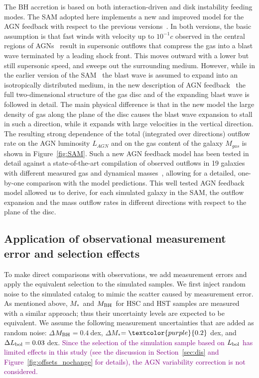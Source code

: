 \documentclass[twocolumn]{aastex631}
\newcommand{\red}[1]{\textcolor{purple}{#1}}
\def\smass{{$M_*$}}
\def\mbh{$M_{\rm BH}$}
\begin{document}
The BH accretion is based on both interaction-driven and disk instability feeding modes.
The SAM adopted here implements a new and improved  model for the AGN feedback with respect to the previous versions~\citep{Menci2008}. In both versions, the basic assumption is that fast winds with velocity up to $10^{-1}c$ observed in the central regions of AGNs~\citep{Chartas2002, Pounds2003}  result in  supersonic outflows that compress the gas into a blast wave terminated by a leading shock front. This  moves outward with a lower but still supersonic speed, and sweeps out the surrounding medium. However, while in the earlier version of the SAM~\citep{Menci2016} the blast wave is assumed to expand into an isotropically distributed medium, in the new description of AGN feedback~\citep{Menci2019} the full two-dimensional structure of the gas disc and of the expanding blast wave is followed in detail. The main physical difference is that in the new model the large density of gas along the plane of the disc causes the blast wave expansion to stall in such a direction, while it expands with large velocities in the vertical direction. The resulting strong dependence of the total (integrated over directions) outflow rate on the AGN luminosity $L_{AGN}$ and on the gas content of the galaxy $M_{gas}$ is shown in Figure~\ref{fig:SAM}. Such a new AGN feedback model has been tested in detail against a state-of-the-art compilation of observed outflows in 19 galaxies with different measured gas and dynamical masses~\citep{Fiore2017}, allowing for a detailed, one-by-one comparison with the model predictions. This well tested AGN feedback model allowed us to derive, for each simulated galaxy in the SAM,  the outflow expansion and the mass outflow rates in different directions with respect to the plane of the disc.



\subsection{Application of observational measurement error and selection effects}\label{subsec:add_obs_eff}
To make direct comparisons with observations, we add measurement errors and apply the equivalent selection to the simulated samples. We first inject random noise to the simulated catalog to mimic the scatter caused by measurement error. As mentioned above, \smass\ and \mbh\ for HSC and HST samples are measured with a similar approach; thus their uncertainty levels are expected to be equivalent. We assume the following measurement uncertainties that are added as random noise: $\Delta$\mbh$ = 0.4~$dex, $\Delta$\smass$ = \red{0.2}~$dex, and $\Delta L_{\rm bol} = 0.03~$dex. \red{Since the selection of the simulation sample based on $L_{\rm bol}$ has limited effects in this study (see the discussion in Section~\ref{sec:dis} and Figure~\ref{fig:offsets_nochange} for details), the AGN variability correction is not considered.}
\end{document}
